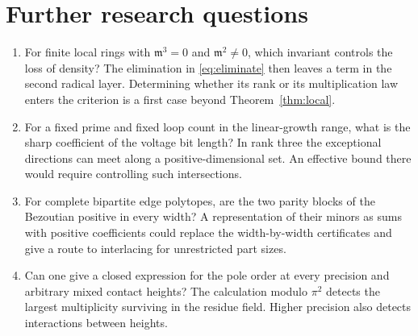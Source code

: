 \documentclass[11pt,letterpaper]{article}
\begin{document}
\section{Further research questions}
\begin{enumerate}
\item For finite local rings with $\mathfrak m^3=0$ and $\mathfrak m^2\ne0$, which invariant controls the loss of density? The elimination in \eqref{eq:eliminate} then leaves a term in the second radical layer. Determining whether its rank or its multiplication law enters the criterion is a first case beyond Theorem~\ref{thm:local}.
\item For a fixed prime and fixed loop count in the linear-growth range, what is the sharp coefficient of the voltage bit length? In rank three the exceptional directions can meet along a positive-dimensional set. An effective bound there would require controlling such intersections.
\item For complete bipartite edge polytopes, are the two parity blocks of the Bezoutian positive in every width? A representation of their minors as sums with positive coefficients could replace the width-by-width certificates and give a route to interlacing for unrestricted part sizes.
\item Can one give a closed expression for the pole order at every precision and arbitrary mixed contact heights? The calculation modulo $\pi^2$ detects the largest multiplicity surviving in the residue field. Higher precision also detects interactions between heights.
\end{enumerate}
\end{document}
